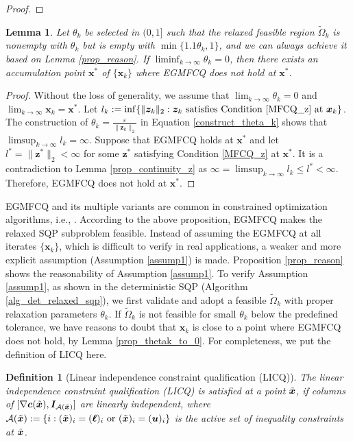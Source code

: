 \documentclass[aos]{imsart}
\numberwithin{equation}{section}
\theoremstyle{plain}
\newtheorem{definition}{Definition}
\newtheorem{lemma}{Lemma}
\begin{document}
\begin{appendix}
\begin{proof}
\end{proof}


\begin{lemma}
    Let $\theta_k$ be selected in $(0,1]$ such that the relaxed feasible region $\widetilde{\Omega}_k$ is nonempty with $\theta_k$ but is empty with $\min\{1.1\theta_k,1\}$, and we can always achieve it based on Lemma \ref{prop_reason}. If $\mathop{\lim \inf}_{k \to \infty} \theta_k = 0$, then there exists an accumulation point $\bm{x}^{*}$ of $\{\bm{x}_k\}$ where EGMFCQ does not hold at $\bm{x}^{*}$.
\end{lemma}


\begin{proof}
    Without the loss of generality, we assume that $\lim_{k \to \infty} \theta_k = 0$ and $\lim_{k \to \infty} \bm{x}_k = \bm{x}^{*}$. Let $l_k := \inf \{\|\bm{z}_k\|_2: \bm{z}_k~ \text{satisfies Condition \eqref{MFCQ_z} at}~ \bm{x}_k\}$. The construction of $\theta_k = \frac{\varepsilon}{\|\bm{z}_k\|_2}$ in Equation \eqref{construct_theta_k} shows that $\mathop{\lim \sup}_{k \to \infty} l_k = \infty$. Suppose that EGMFCQ holds at $\bm{x}^{*}$ and let $l^{*} = \|\bm{z}^{*}\|_2 < \infty$ for some $\bm{z}^{*}$ satisfying Condition \eqref{MFCQ_z} at $\bm{x}^{*}$. It is a contradiction to Lemma \ref{prop_continuity_z} as $\infty = \mathop{\lim \sup}_{k \to \infty} l_k \leq l^{*} < \infty$. Therefore, EGMFCQ does not hold at $\bm{x}^{*}$.
\end{proof}


EGMFCQ and its multiple variants are common in constrained optimization algorithms, i.e., \cite{burke1989robust, xu2015smoothing}. According to the above proposition, EGMFCQ makes the relaxed SQP subproblem feasible. Instead of assuming the EGMFCQ at all iterates $\{\bm{x}_k\}$, which is difficult to verify in real applications, a weaker and more explicit assumption (Assumption \ref{assump1}) is made. Proposition \ref{prop_reason} shows the reasonability of Assumption \ref{assump1}. To verify Assumption \ref{assump1}, as shown in the deterministic SQP (Algorithm \ref{alg_det_relaxed_sqp}), we first validate and adopt a feasible $\widetilde{\Omega}_k$ with proper relaxation parameters $\theta_k$. If $\widetilde{\Omega}_k$ is not feasible for small $\theta_k$ below the predefined tolerance, we have reasons to doubt that $\bm{x}_k$ is close to a point where EGMFCQ does not hold, by Lemma \ref{prop_thetak_to_0}. For completeness, we put the definition of LICQ here.

\begin{definition}
    [Linear independence constraint qualification (LICQ)]
    \label{definition_LICQ}
    The linear independence constraint qualification (LICQ) is satisfied at a point $\Tilde{\bm{x}}$, if columns of $[\nabla \bm{c}(\Tilde{\bm{x}}), \bm{I}_{\mathcal{A}(\Tilde{\bm{x}})}]$ are linearly independent, where $\mathcal{A}(\Tilde{\bm{x}}):=\{i: (\Tilde{\bm{x}})_i = (\bm{\ell})_i~\text{or}~(\Tilde{\bm{x}})_i = (\bm{u})_i\}$ is the active set of inequality constraints at $\Tilde{\bm{x}}$.
\end{definition}



\end{appendix}
\end{document}
